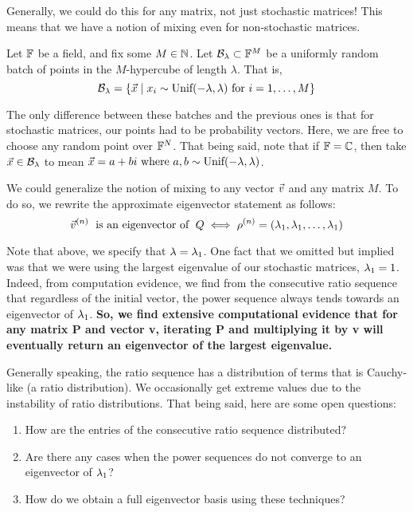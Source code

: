 Generally, we could do this for any matrix, not just stochastic matrices!
This means that we have a notion of mixing even for non-stochastic matrices.

\begin{definition}
Let $\F$ be a field, and fix some $M \in \N$. Let $\B_\lambda \subset \F^M$ be a uniformly random batch of points in the $M$-hypercube of length $\lambda$. That is,
$$\B_\lambda = \{\vec{x} \mid x_i \sim \text{Unif}(-\lambda, \lambda) \text{ for } i = \oneto[M]\}$$
\end{definition}

The only difference between these batches and the previous ones is that for stochastic matrices, our points had to be probability vectors.
Here, we are free to choose any random point over $\F^N$.
That being said, note that if $\F = \mathbb{C}$, then take $\vec{x} \in \B_\lambda$ to mean $\vec{x} = a + bi \text{ where } a,b \sim \Unif(-\lambda,\lambda)$.

\newpage
{}

We could generalize the notion of mixing to any vector $\vvec$ and any matrix $M$.
To do so, we rewrite the approximate eigenvector statement as follows:
$$\vvecn{n} \text{\; is an eigenvector of \;} Q \iff \rvecn{n} = (\l_1, \l_1, \dots, \l_1)$$

Note that above, we specify that $\l = \l_1$.
One fact that we omitted but implied was that we were using the largest eigenvalue of our stochastic matrices, $\l_1 = 1$.
Indeed, from computation evidence, we find from the consecutive ratio sequence that regardless of the initial vector,
the power sequence always tends towards an eigenvector of $\l_1$.
\textbf{So, we find extensive computational evidence that for any matrix P and vector v, iterating P and multiplying it by v will eventually return an eigenvector of the largest eigenvalue.}



Generally speaking, the ratio sequence has a distribution of terms that is Cauchy-like (a ratio distribution).
We occasionally get extreme values due to the instability of ratio distributions. That being said, here are some open questions:

\begin{enumerate}
  \item How are the entries of the consecutive ratio sequence distributed?
  \item Are there any cases when the power sequences do not converge to an eigenvector of $\l_1$?
  \item How do we obtain a full eigenvector basis using these techniques?
\end{enumerate}
